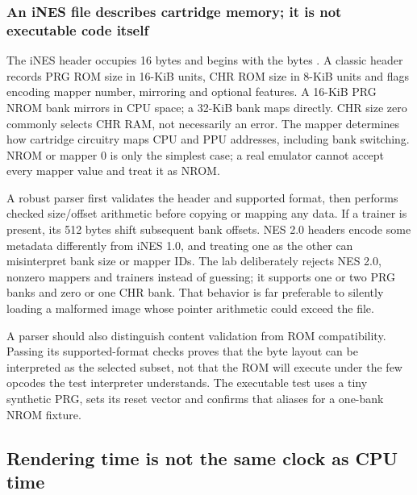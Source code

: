 \subsubsection{An iNES file describes cartridge memory; it is not executable code itself}\label{06-engine-ii-ch042-an-ines-file-describes-cartridge-memory-it-is-not-executable-code-itself}

\hypertarget{06-engine-ii-ch042-an-ines-file-describes-cartridge-memory-it-is-not-executable-code-itself}{}

The iNES header occupies 16 bytes and begins with the bytes    . A classic header records PRG ROM size in 16-KiB units, CHR ROM size in 8-KiB units and flags encoding mapper number, mirroring and optional features. A 16-KiB PRG NROM bank mirrors in CPU space; a 32-KiB bank maps directly. CHR size zero commonly selects CHR RAM, not necessarily an error. The mapper determines how cartridge circuitry maps CPU and PPU addresses, including bank switching. NROM or mapper 0 is only the simplest case; a real emulator cannot accept every mapper value and treat it as NROM.

A robust parser first validates the header and supported format, then performs checked size/offset arithmetic before copying or mapping any data. If a trainer is present, its 512 bytes shift subsequent bank offsets. NES 2.0 headers encode some metadata differently from iNES 1.0, and treating one as the other can misinterpret bank size or mapper IDs. The lab deliberately rejects NES 2.0, nonzero mappers and trainers instead of guessing; it supports one or two PRG banks and zero or one CHR bank. That behavior is far preferable to silently loading a malformed image whose pointer arithmetic could exceed the file.

A parser should also distinguish content validation from ROM compatibility. Passing its supported-format checks proves that the byte layout can be interpreted as the selected subset, not that the ROM will execute under the few opcodes the test interpreter understands. The executable test uses a tiny synthetic PRG, sets its reset vector and confirms that  aliases  for a one-bank NROM fixture.

\subsection{Rendering time is not the same clock as CPU time}\label{06-engine-ii-ch042-rendering-time-is-not-the-same-clock-as-cpu-time}

